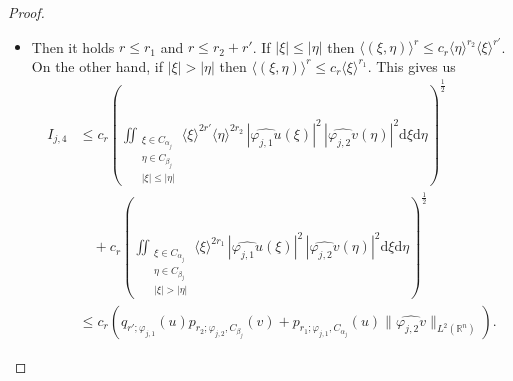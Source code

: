 \documentclass{amsart}
\theoremstyle{definition}
\begin{document}
\begin{proof}
\begin{itemize}
\begin{itemize}
\begin{align*}
& \quad + c_r \left( \iint_{\substack{ \xi \in C_{\alpha_j} \\ \eta \in C_{\beta_j} \\ |\xi| > |\eta| }} \langle \xi  \rangle^{2r_1} \, | \widehat{\varphi_{j,1} u} (\xi) |^2 \, | \widehat{\varphi_{j,2} v} (\eta)|^2 \mathrm{d}\xi \mathrm{d}\eta \right)^{\frac{1}{2}} \\
& \leq c_r \left( \lVert \widehat{\varphi_{j,1} u} \rVert_{L^2 (\mathbb{R}^m)} p_{r_2 ; \varphi_{j,2} , C_{\beta_j}} (v) + p_{r_1 ; \varphi_{j,1} , C_{\alpha_j}} (u) \lVert \widehat{\varphi_{j,2} v} \rVert_{L^2 (\mathbb{R}^n)} \right). 
\end{align*}
\item[b) \underline{$r'<0\leq r''$:}]
Then it holds $r\leq r_1$ and $r\leq r_2 + r'$. If $|\xi|\leq |\eta|$ then $\langle (\xi , \eta) \rangle^{r} \leq c_r \langle \eta \rangle^{r_2} \langle \xi \rangle^{r'}$. On the other hand, if $|\xi| > |\eta|$ then $\langle (\xi , \eta) \rangle^{r} \leq c_r \langle \xi \rangle^{r_1}$. This gives us
\begin{align*}
I_{j,4}
& \leq c_r \left( \iint_{\substack{ \xi \in C_{\alpha_j} \\ \eta \in C_{\beta_j} \\ |\xi| \leq |\eta| }} \langle  \xi \rangle^{2r'} \langle  \eta \rangle^{2r_2} \, |\widehat{\varphi_{j,1} u} (\xi) |^2 \, | \widehat{\varphi_{j,2} v} (\eta)|^2 \mathrm{d}\xi \mathrm{d}\eta \right)^{\frac{1}{2}} \\
& \quad + c_r \left( \iint_{\substack{ \xi \in C_{\alpha_j} \\ \eta \in C_{\beta_j} \\ |\xi| > |\eta| }} \langle \xi  \rangle^{2r_1} \, | \widehat{\varphi_{j,1} u} (\xi) |^2 \, | \widehat{\varphi_{j,2} v} (\eta)|^2 \mathrm{d}\xi \mathrm{d}\eta \right)^{\frac{1}{2}} \\
& \leq c_r (q_{r' ; \varphi_{j,1}} (u) p_{r_2;\varphi_{j,2} , C_{\beta_j}} (v) + p_{r_1 ; \varphi_{j,1} , C_{\alpha_j}} (u) \lVert \widehat{\varphi_{j,2} v} \rVert_{L^2 (\mathbb{R}^n)}) .
\end{align*}

\end{itemize}
\end{itemize}
\end{proof}
\end{document}
